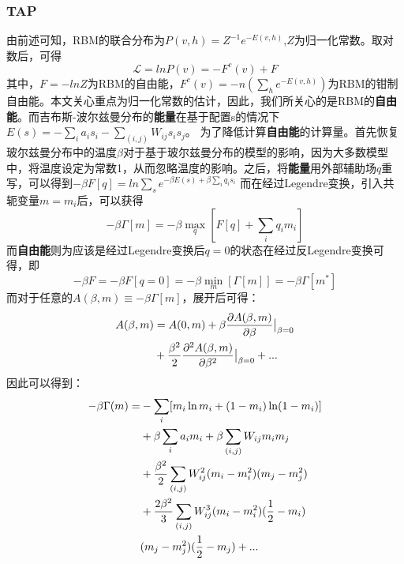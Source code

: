 \documentclass[journal,a4paper]{IEEEtran}
\begin{document}
	\subsubsection{TAP\cite{gabrie2015training}}
		由前述可知，RBM的联合分布为$P(v,h)=Z^{-1}e^{-E(v,h)}$,$Z$为归一化常数。取对数后，可得
		\begin{equation}
			\mathcal{L} = lnP(v) = - F^c(v)+F
		\end{equation}
		其中，$F = -lnZ$为RBM的自由能，$F^c(v)= -n(\sum_he^{-E(v,h)})$为RBM的钳制自由能。本文关心重点为归一化常数的估计，因此，我们所关心的是RBM的\textbf{自由能}。而吉布斯-波尔兹曼分布的\textbf{能量}在基于配置s的情况下$E(s) = -\sum_ia_is_i-\sum_{(i,j)}W_{ij}s_is_j$。
		为了降低计算\textbf{自由能}的计算量。首先恢复玻尔兹曼分布中的温度$\beta$对于基于玻尔兹曼分布的模型的影响，因为大多数模型中，将温度设定为常数1，从而忽略温度的影响。之后，将\textbf{能量}用外部辅助场$q$重写，可以得到$-\beta F[q] = ln \sum_se^{-\beta E(s)+ \beta\sum_iq_is_i} $ 而在经过Legendre变换，引入共轭变量$ m  = {m_i}$后，可以获得
		\begin{equation}
		 -\beta \Gamma[m]= -\beta \max_q[F[q]+\sum_iq_im_i]
		\end{equation}
		而\textbf{自由能}则为应该是经过Legendre变换后$q=0$的状态在经过反Legendre变换可得，即
		\begin{equation}
		 -\beta F= -\beta F[q=0] = -\beta \min_m[ \Gamma[m]] = -\beta  \Gamma[m^*]
		\end{equation}
		而对于任意的$A(\beta,m) \equiv -\beta\Gamma[m] $，展开后可得：
		\begin{align}
		A(\beta,m) & = A(0,m) + \beta \frac{\partial A(\beta,m)}{\partial\beta}\big|_{\beta=0} \notag \\
		& + \frac{\beta^2}{2}\frac{\partial^2A(\beta,m)}{\partial\beta^2}\big|_{\beta=0} + ...
		\end{align}
		因此可以得到：
		\begin{align}
		-\beta\Gamma(m)= &-\sum_i[m_i\ln m_i + (1-m_i)\ln(1-m_i)] \notag \\
		& +\beta \sum_i a_im_i + \beta \sum_{(i,j)} W_{ij}m_im_j \notag \\
		& +\frac{\beta^2}{2} \sum_{(i,j)} W_{ij}^2(m_i-m_i^2)(m_j -m_j^2) \notag \\
		& +\frac{2\beta^2}{3} \sum_{(i,j)} W_{ij}^3(m_i-m_i^2)(\frac{1}{2}-m_i) \notag \\
		& (m_j -m_j^2)(\frac{1}{2}-m_j) + ...
		\end{align}
\end{document}
